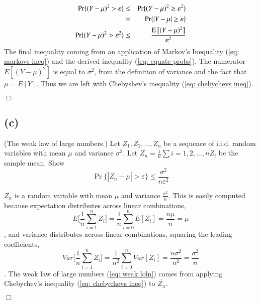 \documentclass[10pt]{article}
\DeclareMathOperator*{\E}{\mbox{\text{E}}}
\newcommand{\pref}[1]{{(\ref{#1})}}
\begin{document}
\begin{tiny}
\begin{multicols}{3}
\begin{eqnarray}
    \Pr\{(Y-\mu)^2 > \varepsilon\} &\leq& \Pr\{(Y-\mu)^2 \geq \varepsilon^2\}
        \nonumber \\
        &=& \Pr\{|Y-\mu| \geq \varepsilon\}
        \label{eq: equate probs} \\
    \Pr \{(Y-\mu)^2 > \varepsilon^2\} &\leq& \frac{\E \big[(Y-\mu)^2\big]}{\varepsilon^2}
        \label{eq:instatiate 3.1a}
\end{eqnarray}
The final inequality coming from an application of Markov's Inequality
\pref{eq: markovs ineq} and the derived inequality \pref{eq: equate probs}.
The numerator $E[(Y-\mu)^2]$ is equal to $\sigma^2$, from the definition
of variance and the fact that $\mu = E[Y]$. Thus we are left with
Chebyshev's inequality \pref{eq: chebychevs ineq}.
\begin{flushright}
    $\Box$
\end{flushright}

\subsection*{(c)}

(The weak law of large numbers.) Let $Z_1,Z_2,\dots,Z_n$ be a sequence of
i.i.d. random variables with mean $\mu$ and variance $\sigma^2$. Let
$\overline{Z_n} = \frac{1}{n}\sum{i=1,2,\dots,n}Z_i$ be the sample mean.
Show 
\begin{equation}
    \Pr \{|\overline{Z_n} - \mu| > \varepsilon\} \leq
    \frac{\sigma^2}{n\varepsilon^2}
    \label{eq: weak loln}
\end{equation}

\proof

$\overline{Z_n}$ is a random variable with mean $\mu$ and variance
$\frac{\sigma^2}{n}$. This is easily computed because expectation
distributes across linear combinations, 
\begin{equation*}
    E\bigg[\frac{1}{n}\sum_{i=1}^{n}Z_i\bigg] 
    = \frac{1}{n} \sum_{i=0}^{n} E[Z_i] = \frac{n\mu}{n} = \mu
\end{equation*}
, and variance distributes across linear combinations, squaring the
leading coefficients,
\begin{equation*}
    Var\bigg[\frac{1}{n}\sum_{i=1}^{n}Z_i\bigg]
    = \frac{1}{n^2}\sum_{i=0}^{n} Var[Z_i] 
    = \frac{n\sigma^2}{n^2} 
    = \frac{\sigma^2}{n}
\end{equation*}
. The weak law of large numbers \pref{eq: weak loln} comes from applying
Chebychev's inequality \pref{eq: chebychevs ineq} to $\overline{Z_n}$.
\begin{flushright}
    $\Box$
\end{flushright}

\end{multicols}
\end{tiny}
\end{document}
